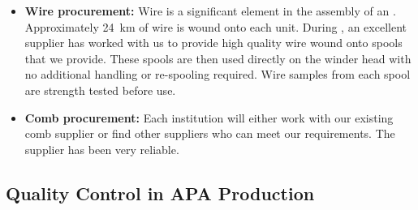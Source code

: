 \begin{itemize}
\item {\bf Wire procurement:} Wire is a significant element in the assembly of an . Approximately \SI{24}{km} of wire is wound onto each unit. During , %
an excellent supplier %
has worked with us to provide high quality wire wound onto spools that we provide. These spools are then used directly on the winder head with no additional handling or re-spooling required. Wire samples from each spool are strength tested before use.

\item {\bf Comb procurement:} Each institution will either work with our existing comb supplier or find other suppliers who can meet our requirements. The  supplier has been very reliable.


\end{itemize}


\subsection{Quality Control in APA Production}
\label{sec:fdsp-apa-prod-qc}




